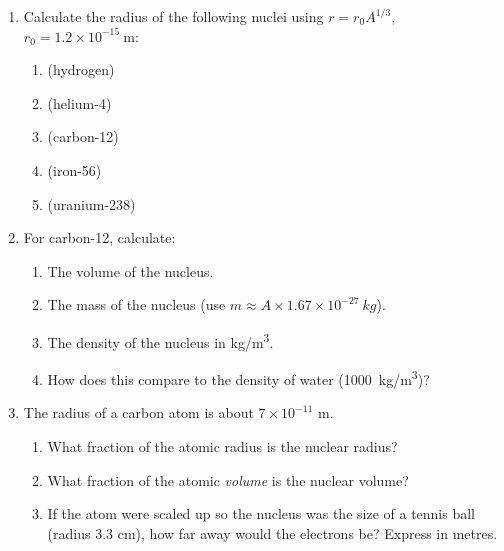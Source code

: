 \documentclass[12pt, a4paper]{book}
\theoremstyle{definition}
\begin{document}
\begin{problembox}
\begin{enumerate}[label=\textbf{\arabic*.}]
  \item Calculate the radius of the following nuclei
        using $r = r_0 A^{1/3}$, $r_0 = 1.2\times10^{-15}\ \si{\metre}$:
        \begin{enumerate}[label=(\alph*)]
          \item {} (hydrogen)
          \item {} (helium-4)
          \item {} (carbon-12)
          \item {} (iron-56)
          \item {} (uranium-238)
        \end{enumerate}

  \item For carbon-12, calculate:
        \begin{enumerate}[label=(\alph*)]
          \item The volume of the nucleus.
          \item The mass of the nucleus
                (use $m \approx A \times 1.67\times10^{-27}\ \si{kg}$).
          \item The density of the nucleus in \si{kg/m^3}.
          \item How does this compare to the density of water
                (\SI{1000}{kg/m^3})?
        \end{enumerate}

  \item The radius of a carbon atom is about
        $7\times10^{-11}$ m.
        \begin{enumerate}[label=(\alph*)]
          \item What fraction of the atomic radius is the nuclear radius?
          \item What fraction of the atomic \emph{volume} is the nuclear volume?
          \item If the atom were scaled up so the nucleus
                was the size of a tennis ball (radius 3.3 cm),
                how far away would the electrons be?
                Express in metres.
        \end{enumerate}
\end{enumerate}
\end{problembox}

\end{document}
